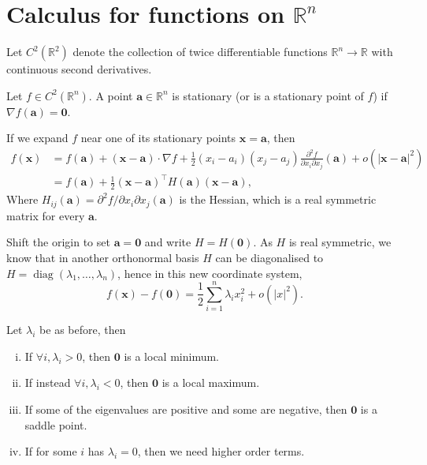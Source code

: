 \documentclass{article}
\begin{document}
\section{Calculus for functions on $ \mathbb{R} ^n $}
Let $C^2(\mathbb R^2)$ denote the collection of twice differentiable functions $\mathbb R^n\to\mathbb R$ with continuous second derivatives.
\begin{definition}
    Let $f\in C^2(\mathbb R^n)$.
    A point $\mathbf{a}\in\mathbb R^n$ is stationary (or is a stationary point of $f$) if $\nabla f(\mathbf{a})=\mathbf{0}$.
\end{definition}
If we expand $f$ near one of its stationary points $\mathbf{x}=\mathbf{a}$, then
\begin{align*}
    f(\mathbf{x})&=f(\mathbf{a})+(\mathbf{x}-\mathbf{a})\cdot\nabla f+\frac{1}{2}(x_i-a_i)(x_j-a_j)\frac{\partial^2f}{\partial x_i\partial x_j}(\mathbf{a})+o(|\mathbf{x}-\mathbf{a}|^2)\\
    &=f(\mathbf{a})+\frac{1}{2}(\mathbf{x}-\mathbf{a})^\top H(\mathbf{a})(\mathbf{x}-\mathbf{a}),
\end{align*}
Where $H_{ij}(\mathbf{a})=\partial^2f/\partial x_i\partial x_j(\mathbf{a})$ is the Hessian, which is a real symmetric matrix for every $\mathbf{a}$.

Shift the origin to set $\mathbf{a}=\mathbf{0}$ and write $H=H(\mathbf{0})$.
As $H$ is real symmetric, we know that in another orthonormal basis $H$ can be diagonalised to $H=\operatorname{diag}(\lambda_1,\ldots,\lambda_n)$, hence in this new coordinate system,
$$f(\mathbf{x})-f(\mathbf{0})=\frac{1}{2}\sum_{i=1}^n\lambda_ix_i^2+o(|x|^2).$$

\begin{theorem}
    Let $\lambda_i$ be as before, then 
    \begin{enumerate}[(i)]
        \item If $\forall i,\lambda_i>0$, then $\mathbf{0}$ is a local minimum.
        \item If instead $\forall i,\lambda_i<0$, then $\mathbf{0}$ is a local maximum.
        \item If some of the eigenvalues are positive and some are negative, then $ \mathbf{0} $ is a saddle point.
        \item If for some $i$ has $\lambda_i=0$, then we need higher order terms. 
    \end{enumerate}
\end{theorem}
\end{document}
